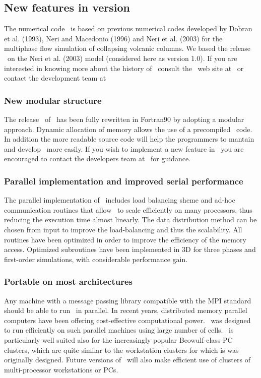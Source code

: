 \begin{itemize}
\end{itemize}

\subsection{New features in version \PASTPDACVERSION}

The numerical code \PDAC\ is based on previous numerical codes developed
by Dobran et al. (1993), Neri and Macedonio (1996) and Neri et al. (2003)
for the multiphase flow simulation of collapsing volcanic columns. We based
the release \PASTPDACVERSION\ on the Neri et al. (2003) model (considered 
here as version 1.0). If you are interested in knowing more about
the history of \PDAC\, consult the \PDAC\ web site at 
\PDACURL\ or contact the development team at 
\PDACADDRESS\

\subsubsection*{New modular structure}
The release \PASTPDACVERSION\ of \PDAC\ has been fully rewritten in 
Fortran90 by adopting a modular approach. Dynamic allocation of memory
allows the use of a precompiled \PDAC\ code. In addition the more readable 
source code will help the programmers to mantain and develop \PDAC\ more easily.
If you wish to implement a new feature in \PDAC\ you are encouraged to contact 
the developers team at \PDACADDRESS\ for guidance.

\subsubsection*{Parallel implementation and improved serial performance}
The parallel implementation of \PDAC\ includes load balancing sheme 
and ad-hoc communication routines that allow \PDAC\ to scale efficiently 
on many processors, thus reducing the execution time almost linearly.
The data distribution method can be chosen from input to improve the 
load-balancing and thus the scalability. All routines have been 
optimized in order to improve the efficiency of the memory access.
Optimized subroutines have been implemented in 3D for three phases and
first-order simulations, with considerable performance gain.

\subsubsection*{Portable on most architectures}
Any machine with a message passing library compatible with the MPI 
standard should be able to run \PDAC\ in parallel.
In recent years, distributed memory parallel computers have been offering
cost-effective computational power.  \PDAC\ was designed to run efficiently
on such parallel machines using large number of cells. 
\PDAC\ is particularly well suited also for the increasingly popular Beowulf-class PC 
clusters, which are quite similar to the workstation clusters for which is was 
originally designed.
Future versions of \PDAC\ will also make efficient use of clusters of 
multi-processor workstations or PCs.

